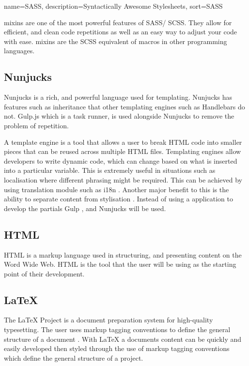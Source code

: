 %
{
  name={SASS},
  description={Syntactically Awesome Stylesheets},
  sort=SASS
}
%

\gls{mixins} are one of the most powerful features of \gls{SASS}/ \gls{SCSS}. They allow for efficient, and clean code repetitions as well as an easy way to adjust your code with ease. \gls{mixins} are the \gls{SCSS} equivalent of macros in other programming languages.

\subsection*{Nunjucks}
Nunjucks is a rich, and powerful language used for templating. Nunjucks has features such as inheritance that other templating engines such as Handlebars do not. Gulp.js which is a task runner, is used alongside Nunjucks to remove the problem of repetition. 

A template engine is a tool that allows a user to break HTML code into smaller pieces that can be reused across multiple HTML files. Templating engines allow developers to write dynamic code, which can change based on what is inserted into a particular variable. This is extremely useful in situations such as localisation where different phrasing might be required. This can be achieved by using translation module such as i18n \citep{NPM16}. Another major benefit to this is the ability to separate content from stylisation \citep{CONT05}. Instead of using a application to develop the partials Gulp \citep{GULP17}, and Nunjucks \citep{NUN17} will be used.

\subsection*{HTML}
HTML is a markup language used in structuring, and presenting content on the Word Wide Web. HTML is the tool that the user will be using as the starting point of their development.

\subsection*{LaTeX}
The LaTeX Project is a document preparation system for high-quality typesetting. The user uses markup tagging conventions to define the general structure of a document \citep{LAT17}. With LaTeX a documents content can be quickly and easily developed then styled through the use of markup tagging conventions which define the general structure of a project.

